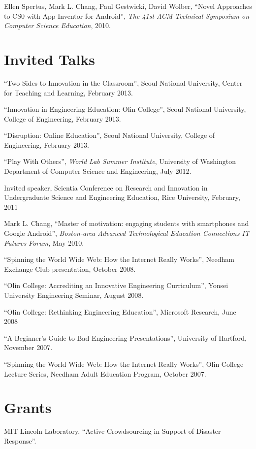 \documentclass[line]{res}
\begin{document}
\begin{resume}
	Ellen Spertus, Mark L. Chang, Paul Gestwicki, David Wolber, ``Novel Approaches to CS0 with App Inventor for Android'', \textit{The 41st ACM Technical Symposium on Computer Science Education}, 2010.
	
	\section{\sc Invited Talks}

	``Two Sides to Innovation in the Classroom'', Seoul National University, Center for Teaching and Learning, February 2013.

	``Innovation in Engineering Education: Olin College'', Seoul National University, College of Engineering, February 2013.

	``Disruption: Online Education'', Seoul National University, College of Engineering, February 2013.
	
	``Play With Others'', \textit{World Lab Summer Institute}, University of Washington Department of Computer Science and Engineering, July 2012.

	Invited speaker, Scientia Conference on Research and Innovation in Undergraduate Science and Engineering Education, Rice University, February, 2011
	
	Mark L. Chang, ``Master of motivation: engaging students with smartphones and Google Android'', \textit{Boston-area Advanced Technological Education Connections IT Futures Forum}, May 2010.
	
	``Spinning the World Wide Web: How the Internet Really Works'', Needham Exchange Club presentation, October 2008.
	
	``Olin College: Accrediting an Innovative Engineering Curriculum'', Yonsei University Engineering Seminar, August 2008.
	
	``Olin College: Rethinking Engineering Education'', Microsoft Research, June 2008
	
	``A Beginner's Guide to Bad Engineering Presentations'', University of Hartford, November 2007.
	
	``Spinning the World Wide Web: How the Internet Really Works'', Olin College Lecture Series, Needham Adult Education Program, October 2007.
	
	\section{\sc Grants}
	MIT Lincoln Laboratory, ``Active Crowdsourcing in Support of Disaster Response''.
	

\end{resume}
\end{document}

